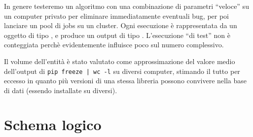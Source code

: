 \documentclass{article}
\begin{document}
In genere testeremo un algoritmo con una combinazione di parametri ``veloce'' su un computer privato per eliminare immediatamente eventuali bug, per poi lanciare un pool di jobs su un cluster. Ogni esecuzione è rappresentata da un oggetto di tipo , e produce un output di tipo . L'esecuzione ``di test'' non è conteggiata perchè evidentemente influisce poco sul numero complessivo.

Il volume dell'entità  è stato valutato come approssimazione del valore medio dell'output di \texttt{pip freeze | wc -l} su diversi computer, stimando il tutto per eccesso in quanto più versioni di una stessa libreria possono convivere nella base di dati (essendo installate su  diversi).

\section{Schema logico}
\begin{table}[H]
\end{table}
\end{document}
